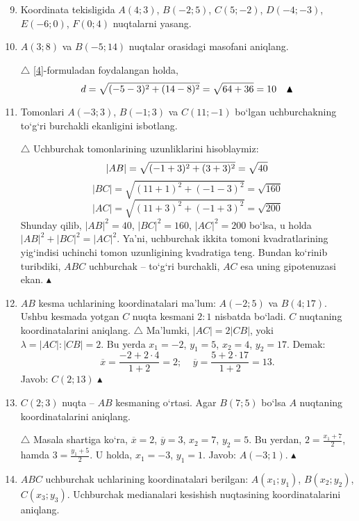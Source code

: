 \begin{enumerate}
	\setcounter{enumi}{8}
	\item Koordinata tekisligida $A(4;3)$, $B(-2;5)$, $C(5;-2)$, $D(-4;-3)$, $E(-6;0)$, $F(0;4)$ nuqtalarni yasang.
	
	\item $A(3;8)$ va $B(-5;14)$ nuqtalar orasidagi masofani aniqlang.
	
	$\bigtriangleup$ \eqref{4}-formuladan foydalangan holda,
	$$d=\sqrt{(-5-3)^{2}+(14-8)^{2}}=\sqrt{\mathstrut 64+36}=10\ \ \ \blacktriangle$$
	
	\item Tomonlari $A(-3;3)$, $B(-1;3)$ va $C(11;-1)$ bo`lgan uchburchakning to`g`ri burchakli ekanligini isbotlang.
	
	$\bigtriangleup$ Uchburchak tomonlarining uzunliklarini hisoblaymiz:
	$$|AB|=\sqrt{\mathstrut (-1+3)^{2}+(3+3)^{2}}=\sqrt{\mathstrut 40}$$
	$$|BC|=\sqrt{(11+1)^{2}+(-1-3)^{2}}=\sqrt{160}$$
	$$|AC|=\sqrt{(11+3)^{2}+(-1+3)^{2}}=\sqrt{200}$$
	Shunday qilib, $|AB|^{2}=40$, $|BC|^{2}=160$, $|AC|^{2}=200$ bo`lsa, u holda $|AB|^{2}+|BC|^{2}=|AC|^{2}$. Ya'ni, uchburchak ikkita tomoni kvadratlarining yig`indisi uchinchi tomon uzunligining kvadratiga teng. Bundan ko`rinib turibdiki, $ABC$ uchburchak -- to`g`ri burchakli, $AC$ esa uning gipotenuzasi ekan. $\blacktriangle$
	
	\item $AB$ kesma uchlarining koordinatalari ma'lum: $A(-2;5)$ va $B(4;17)$. Ushbu kesmada yotgan $C$ nuqta kesmani $2:1$ nisbatda bo`ladi. $C$ nuqtaning koordinatalarini aniqlang.
	$\triangle$ Ma'lumki, $|AC|=2|CB|$, yoki $\lambda=|AC|:|CB|=2$. Bu yerda $x_{1}=-2$, $y_{1}=5$, $x_{2}=4$, $y_{2}=17$. Demak:
	$$\overline{x}=\frac{-2+2\cdot4}{1+2}=2;\ \ \ \ \ \overline{y}=\frac{5+2\cdot17}{1+2}=13.$$
	Javob: $C(2;13)$ $\blacktriangle$
	
	\item $C(2;3)$ nuqta -- $AB$ kesmaning o`rtasi. Agar $B(7;5)$ bo`lsa $A$ nuqtaning koordinatalarini aniqlang.
	
	$\triangle$ Masala shartiga ko`ra, $\overline{x}=2$, $\overline{y}=3$, $x_{2}=7$, $y_{2}=5$. Bu yerdan, $2=\frac{x_{1}+7}{2}$, hamda $3=\frac{y_{1}+5}{2}$. U holda,
	$x_{1}=-3$, $y_{1}=1$. Javob: $A(-3;1)$. $\blacktriangle$  
	
	\item $ABC$ uchburchak uchlarining koordinatalari berilgan: $A(x_{1};y_{1})$, $B(x_{2};y_{2})$, $C(x_{3};y_{3})$. Uchburchak medianalari kesishish nuqtasining koordinatalarini aniqlang.
	

\end{enumerate}
